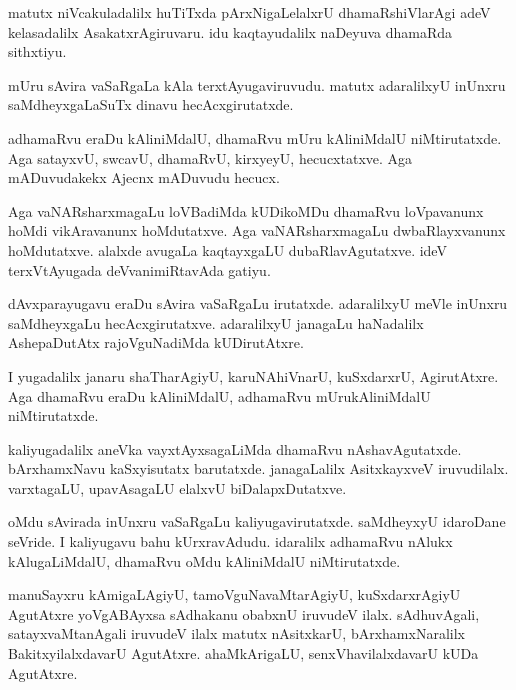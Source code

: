 \begin{mng}
matutx niVcakuladalilx huTiTxda pArxNigaLelalxrU dhamaRshiVlarAgi adeV kelasadalilx AsakatxrAgiruvaru. idu kaqtayudalilx naDeyuva dhamaRda sithxtiyu.
\end{mng}

\begin{mng}
mUru sAvira vaSaRgaLa kAla terxtAyugaviruvudu. matutx adaralilxyU inUnxru saMdheyxgaLaSuTx dinavu hecAcxgirutatxde.
\end{mng}

\begin{mng}
adhamaRvu eraDu kAliniMdalU, dhamaRvu mUru kAliniMdalU niMtirutatxde. Aga satayxvU, swcavU, dhamaRvU, kirxyeyU, hecucxtatxve. Aga mADuvudakekx Ajecnx mADuvudu hecucx.
\end{mng}

\begin{mng}
Aga vaNARsharxmagaLu loVBadiMda kUDikoMDu dhamaRvu loVpavanunx hoMdi vikAravanunx hoMdutatxve. Aga vaNARsharxmagaLu dwbaRlayxvanunx hoMdutatxve. alalxde avugaLa kaqtayxgaLU dubaRlavAgutatxve. ideV terxVtAyugada deVvanimiRtavAda gatiyu.
\end{mng}

\begin{mng}
dAvxparayugavu eraDu sAvira vaSaRgaLu irutatxde. adaralilxyU meVle inUnxru saMdheyxgaLu hecAcxgirutatxve. adaralilxyU janagaLu haNadalilx AshepaDutAtx rajoVguNadiMda kUDirutAtxre.
\end{mng}

\begin{mng}
I yugadalilx janaru shaTharAgiyU, karuNAhiVnarU, kuSxdarxrU, AgirutAtxre. Aga dhamaRvu eraDu kAliniMdalU, adhamaRvu mUrukAliniMdalU niMtirutatxde. 
\end{mng}

\begin{mng}
kaliyugadalilx aneVka vayxtAyxsagaLiMda dhamaRvu nAshavAgutatxde. bArxhamxNavu kaSxyisutatx barutatxde. janagaLalilx AsitxkayxveV iruvudilalx. varxtagaLU, upavAsagaLU elalxvU biDalapxDutatxve.
\end{mng}

\begin{mng}
oMdu sAvirada inUnxru vaSaRgaLu kaliyugavirutatxde. saMdheyxyU idaroDane seVride. I kaliyugavu bahu kUrxravAdudu. idaralilx adhamaRvu nAlukx kAlugaLiMdalU, dhamaRvu oMdu kAliniMdalU niMtirutatxde.
\end{mng}

\begin{mng}
manuSayxru kAmigaLAgiyU, tamoVguNavaMtarAgiyU, kuSxdarxrAgiyU AgutAtxre yoVgABAyxsa sAdhakanu obabxnU iruvudeV ilalx. sAdhuvAgali, satayxvaMtanAgali iruvudeV ilalx matutx nAsitxkarU, bArxhamxNaralilx BakitxyilalxdavarU AgutAtxre. ahaMkArigaLU, senxVhavilalxdavarU kUDa AgutAtxre. 
\end{mng}


